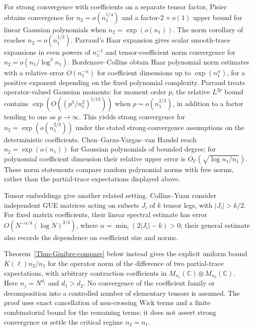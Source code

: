 \documentclass[12pt]{article}
\numberwithin{equation}{section}
\theoremstyle{plain}
\def\bP{\mathbb P}
\def\bC{\mathbb C}
\begin{document}
For strong convergence with coefficients on a separate tensor factor, Pisier \cite{Pisier2014} obtains convergence for $n_2=o(n_1^{1/4})$ and a factor-$2+o(1)$ upper bound for linear Gaussian polynomials when $n_2=\exp(o(n_1))$. The norm corollary of \cite{MR4445344} reaches $n_2=o(n_1^{1/3})$. Parraud's Haar expansion \cite{ParraudHaar2023} gives scalar smooth-trace expansions in even powers of $n_1^{-1}$ and tensor-coefficient norm convergence for $n_2=o(n_1/\log^3 n_1)$. Bordenave--Collins \cite{BordenaveCollins2023} obtain Haar polynomial norm estimates with a relative error $O(n_1^{-\alpha})$ for coefficient dimensions up to $\exp(n_1^\alpha)$, for a positive exponent depending on the fixed polynomial complexity. Parraud \cite[Theorems~1.1--1.2]{ParraudTensor2024} treats operator-valued Gaussian moments: for moment order $p$, the relative $L^{2p}$ bound contains $\exp(O((p^3/n_1^2)^{1/13}))$ when $p=o(n_1^{2/3})$, in addition to a factor tending to one as $p\to\infty$. This yields strong convergence for $n_2=\exp(o(n_1^{2/3}))$ under the stated strong-convergence assumptions on the deterministic coefficients. Chen--Garza-Vargas--van Handel \cite[Corollaries~1.2 and~1.4]{ChenGarzaVargasVanHandel2026} reach $n_2=\exp(o(n_1))$ for Gaussian polynomials of bounded degree; for polynomial coefficient dimension their relative upper error is $O_{\bP}(\sqrt{\log n_1/n_1})$. These norm statements compare random polynomial norms with free norms, rather than the partial-trace expectations displayed above.

Tensor embeddings give another related setting. Collins--Yuan \cite{CollinsYuan2026} consider independent GUE matrices acting on subsets $J_i$ of $k$ tensor legs, with $|J_i|>k/2$. For fixed matrix coefficients, their linear spectral estimate has error $O(N^{-\alpha/4}(\log N)^{3/4})$, where $\alpha=\min_i(2|J_i|-k)>0$; their general estimate also records the dependence on coefficient size and norms.

Theorem~\ref{Thm-Ginibre-compare} below instead gives the explicit uniform bound $K(\ell)n_2/n_1$ for the operator norm of the difference of two partial-trace expectations, with arbitrary contraction coefficients in $M_{n_1}(\bC)\otimes M_{n_2}(\bC)$. Here $n_j=N^{d_j}$ and $d_1>d_2$. No convergence of the coefficient family or decomposition into a controlled number of elementary tensors is assumed. The proof uses exact cancellation of non-crossing Wick terms and a finite combinatorial bound for the remaining terms; it does not assert strong convergence or settle the critical regime $n_2=n_1$.
\end{document}
